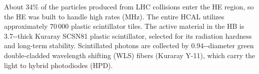 About 34\% of the particles produced from LHC \pp collisions enter the HE region, so the HE was built to handle high rates (MHz).
The entire HCAL utilizes approximately 70\,000 plastic scintillator tiles.
The active material in the HB is 3.7-\mm-thick Kuraray SCSN81 plastic scintillator, selected for its radiation hardness and long-term stability.
Scintillated photons are collected by 0.94-\mm-diameter green double-cladded wavelength shifting (WLS) fibers (Kuraray Y-11), which carry the light to hybrid photodiodes (HPD).

